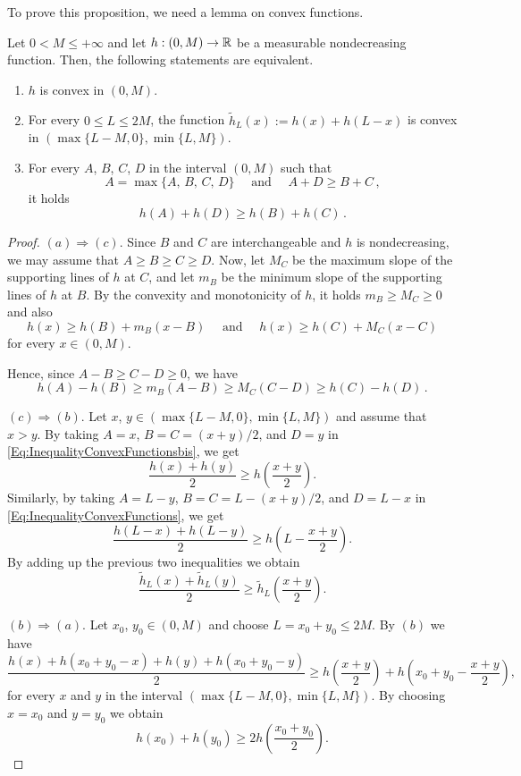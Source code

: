 To prove this proposition, we need a lemma on convex functions. 


\begin{lemma}
	\label{Lemma:ConvexFunctions}
	Let $0<M\leq +\infty$ and let $h:(0,M)\to \mathbb{R}$ be a measurable nondecreasing function. Then, the following statements are equivalent.
	
	\begin{enumerate}[label=(\alph*)]
		\item $h$ is convex in $(0,M)$.
		
		\item For every $0\leq L\leq 2M$, the function $\tilde{h}_L (x) := h(x) + h(L-x)$ is convex in $(\max \{L-M,0\}, \min \{L,M\})$.
		
		\item For every $A$, $B$, $C$, $D$ in the interval $(0,M)$ such that
		$$
		A = \max\{A,\, B,\, C,\, D\} \quad \text{ and } \quad A + D \geq B + C\,,
		$$
		it holds
		\begin{equation}
			\label{Eq:InequalityConvexFunctionsbis}
			h(A) + h(D) \geq h(B) + h(C)\,.
		\end{equation}
	\end{enumerate}
\end{lemma}

\begin{proof}
	$(a)\Rightarrow (c)$.	Since $B$ and $C$ are interchangeable and $h$ is nondecreasing, we may assume that $A \geq B \geq C \geq D$. Now, let $M_C$ be the maximum slope of the supporting lines of $h$ at $C$, and let $m_B$ be the minimum slope of the supporting lines of $h$ at $B$. By the convexity and monotonicity of $h$, it holds $m_B \geq M_C\geq 0$ and also
	$$
	h(x) \geq h(B) + m_B (x-B) \quad \text{ and } \quad h(x) \geq h(C) + M_C (x-C) 
	$$
	for every $x \in (0,M)$.
	
	Hence, since $A-B \geq C-D\geq 0$, we have
	$$
	h(A)-h(B) \geq m_B(A-B) \geq M_C (C-D) \geq h(C) - h(D)\,.
	$$
	
	$(c) \Rightarrow (b)$. Let $x$, $y\in (\max \{L-M,0\}, \min \{L,M\})$ and assume that $x>y$. By taking $A=x$, $B=C=(x+y)/2$, and $D = y$ in \eqref{Eq:InequalityConvexFunctionsbis}, we get 
	$$
	\dfrac{h(x) + h(y)}{2} \geq h \left( \dfrac{x+y}{2}\right). 
	$$ 
	Similarly, by taking $A= L-y$, $B=C=L -(x+y)/2$, and $D = L-x$ in \eqref{Eq:InequalityConvexFunctions}, we get 
	$$
	\dfrac{h(L-x) + h(L-y)}{2} \geq h \left(L - \dfrac{x+y}{2}\right). 
	$$
	By adding up the previous two inequalities we obtain
	$$
	\dfrac{\tilde{h}_L(x) + \tilde{h}_L(y)}{2} \geq \tilde{h}_L \left( \dfrac{x+y}{2}\right). 
	$$ 
	
	$(b) \Rightarrow (a)$. Let $x_0$, $y_0 \in (0,M)$ and choose $L = x_0 + y_0 \leq 2M$. By $(b)$ we have 
	$$
	\dfrac{h(x) + h(x_0 + y_0-x) + h(y) + h(x_0 + y_0-y)}{2} \geq h \left( \dfrac{x+y}{2}\right) + h \left(x_0 + y_0 - \dfrac{x+y}{2}\right),
	$$
	for every $x$ and $y$ in the interval $(\max \{L-M,0\}, \min \{L,M\})$. By choosing $x=x_0$ and $y=y_0$ we obtain
	$$
	h(x_0) + h(y_0)\geq 2 h \left( \dfrac{x_0+y_0}{2}\right). 
	$$
\end{proof}


